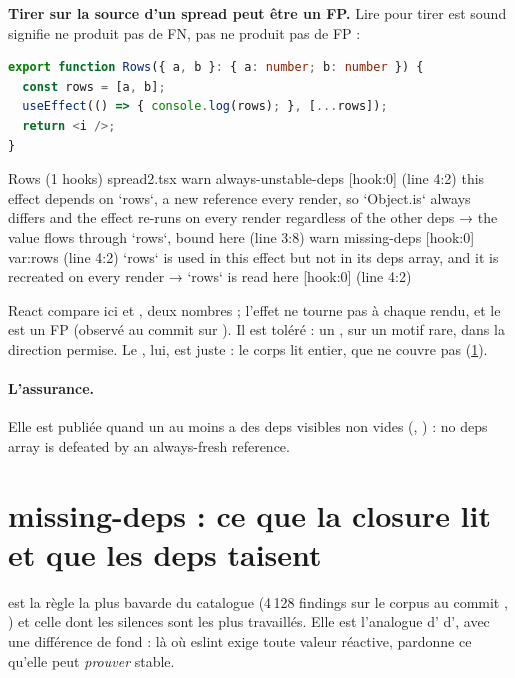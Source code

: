 \begin{piege}
\textbf{Tirer sur la source d'un spread peut être un FP.} \og Lire  pour tirer est sound\fg{} signifie \og ne produit pas de FN\fg{}, pas \og ne produit pas de FP\fg{} :
\begin{lstlisting}[language=TypeScript]
export function Rows({ a, b }: { a: number; b: number }) {
  const rows = [a, b];
  useEffect(() => { console.log(rows); }, [...rows]);
  return <i />;
}
\end{lstlisting}
\begin{sortie}
  Rows  (1 hooks)  spread2.tsx
    warn   always-unstable-deps  [hook:0]  (line 4:2)  this effect depends on `rows`, a new reference every render, so `Object.is` always differs and the effect re-runs on every render regardless of the other deps
       → the value flows through `rows`, bound here (line 3:8)
    warn   missing-deps  [hook:0]  var:rows  (line 4:2)  `rows` is used in this effect but not in its deps array, and it is recreated on every render
       → `rows` is read here [hook:0] (line 4:2)
\end{sortie}
React compare ici  et , deux nombres ; l'effet ne tourne pas à chaque rendu, et le \Warning{}  est un FP (observé au commit \snapshotCommit{} sur ). Il est toléré : un \Warning{}, sur un motif rare, dans la direction permise. Le , lui, est juste : le corps lit  entier, que \code{[...rows]} ne couvre pas (\cref{sec:regles-effets-missing-deps}).
\end{piege}

\paragraph{L'assurance.} Elle est publiée quand un  au moins a des deps visibles non vides (, ) : \og no deps array is defeated by an always-fresh reference\fg{}.


\section{missing-deps : ce que la closure lit et que les deps taisent}
\label{sec:regles-effets-missing-deps}

 est la règle la plus bavarde du catalogue (4\,128 findings sur le corpus au commit , ) et celle dont les silences sont les plus travaillés. Elle est l'analogue d' d', avec une différence de fond : là où eslint exige toute valeur réactive,  pardonne ce qu'elle peut \emph{prouver} stable.

